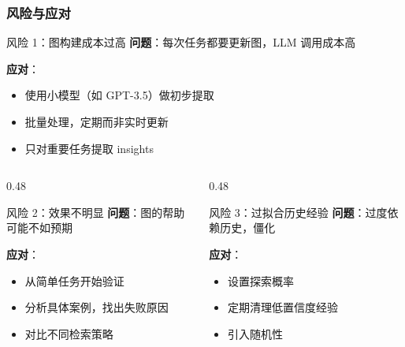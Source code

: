 \documentclass[aspectratio=169,10pt]{beamer}
\begin{document}
\begin{frame}
  \frametitle{风险与应对}

  \begin{block}{风险 1：图构建成本过高}
    \small
    \textbf{问题}：每次任务都要更新图，LLM 调用成本高

    \textbf{应对}：
    \begin{itemize}
      \item 使用小模型（如 GPT-3.5）做初步提取
      \item 批量处理，定期而非实时更新
      \item 只对重要任务提取 insights
    \end{itemize}
  \end{block}

  \begin{columns}[T]
    \begin{column}{0.48\textwidth}
      \begin{block}{风险 2：效果不明显}
        \footnotesize
        \textbf{问题}：图的帮助可能不如预期

        \textbf{应对}：
        \begin{itemize}
          \item 从简单任务开始验证
          \item 分析具体案例，找出失败原因
          \item 对比不同检索策略
        \end{itemize}
      \end{block}
    \end{column}

    \begin{column}{0.48\textwidth}
      \begin{block}{风险 3：过拟合历史经验}
        \footnotesize
        \textbf{问题}：过度依赖历史，僵化

        \textbf{应对}：
        \begin{itemize}
          \item 设置探索概率
          \item 定期清理低置信度经验
          \item 引入随机性
        \end{itemize}
      \end{block}
    \end{column}
  \end{columns}
\end{frame}

\end{document}
